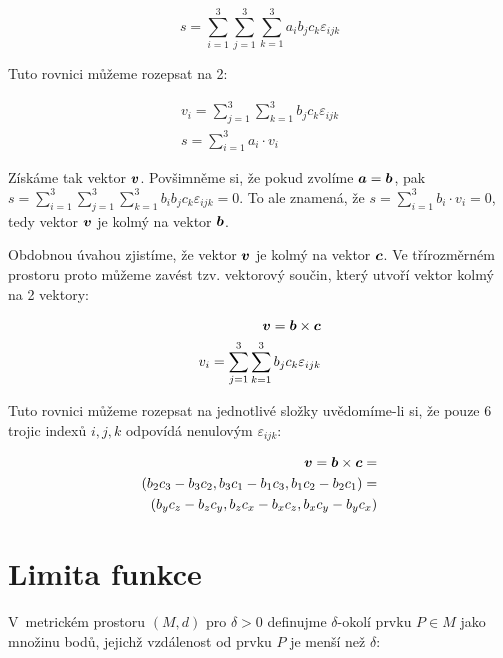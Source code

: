 \begin{equation}
s = \sum_{i=1}^3 \sum_{j=1}^3 \sum_{k=1}^3 a_i b_j c_k \varepsilon_{ijk}
\end{equation}

Tuto rovnici můžeme rozepsat na 2:

\begin{equation}
\begin{split}
v_i = \sum_{j=1}^3 \sum_{k=1}^3 b_j c_k \varepsilon_{ijk} \\
s = \sum_{i=1}^3 a_i \cdot v_i
\end{split}
\end{equation}

Získáme tak vektor \(\boldsymbol{v}\).
Povšimněme si, že pokud zvolíme \(\boldsymbol{a} = \boldsymbol{b}\), pak \(s = \sum_{i=1}^3 \sum_{j=1}^3 \sum_{k=1}^3 b_i b_j c_k \varepsilon_{ijk} = 0\). To ale znamená, že \(s = \sum_{i=1}^3 b_i \cdot v_i = 0\), tedy vektor \(\boldsymbol{v}\) je kolmý na vektor \(\boldsymbol{b}\).

Obdobnou úvahou zjistíme, že vektor \(\boldsymbol{v}\) je kolmý na vektor \(\boldsymbol{c}\). Ve třírozměrném prostoru proto můžeme zavést tzv. vektorový součin, který utvoří vektor kolmý na 2 vektory:

\begin{equation}
\label{eq:vektorovy_soucin}
\begin{split}
\boldsymbol{v} = \boldsymbol{b} \times \boldsymbol{c} \\
v_i = \sum_{j=1}^3 \sum_{k=1}^3 b_j c_k \varepsilon_{ijk}
\end{split}
\end{equation}

Tuto rovnici můžeme rozepsat na jednotlivé složky uvědomíme-li si, že pouze 6 trojic indexů \(i, j, k\) odpovídá nenulovým \(\varepsilon_{ijk}\):

\begin{equation}
\begin{split}
\boldsymbol{v} = \boldsymbol{b} \times \boldsymbol{c} = \\
(b_2 c_3 - b_3 c_2, b_3 c_1 - b_1 c_3, b_1 c_2 - b_2 c_1) = \\
(b_y c_z - b_z c_y, b_z c_x - b_x c_z, b_x c_y - b_y c_x)
\end{split} 
\end{equation}

\section{Limita funkce}

V~metrickém prostoru \((M, d)\) pro \(\delta > 0\) definujme \(\delta\)-okolí prvku \(P \in M\) jako množinu bodů, jejichž vzdálenost od prvku \(P\) je menší než \(\delta\):

